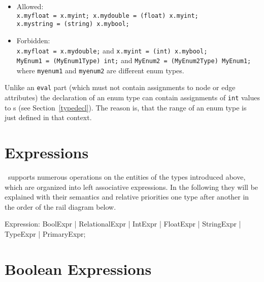 \begin{example}
  \begin{itemize}
    \item Allowed:\\
	  \texttt{x.myfloat = x.myint; x.mydouble = (float) x.myint;\\ x.mystring = (string) x.mybool;}
    \item Forbidden:\\
      \texttt{x.myfloat = x.mydouble;} and \texttt{x.myint = (int) x.mybool;}\\
      \texttt{MyEnum1 = (MyEnum1Type) int;} and \texttt{MyEnum2 = (MyEnum2Type) MyEnum1;}
  where {\tt myenum1} and {\tt myenum2} are different enum types.

  \end{itemize}
\end{example}

\begin{note}
	Unlike an {\tt eval} part (which must not contain assignments to node or edge attributes) the declaration of an enum type can contain assignments of {\tt int} values to s (see Section~\ref{typedecl}).
	The reason is, that the range of an enum type is just defined in that context.
\end{note}


\section{Expressions}\label{sub:expr}

\GrG~supports numerous operations on the entities of the types introduced above, which are organized into left associative expressions.
In the following they will be explained with their semantics and relative priorities one type after another in the order of the rail diagram below.

\begin{rail}
  Expression: BoolExpr | RelationalExpr | IntExpr | FloatExpr | StringExpr | TypeExpr | PrimaryExpr;
\end{rail}


\section{Boolean Expressions}

